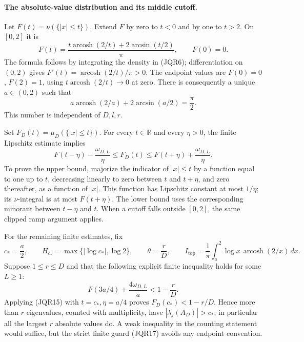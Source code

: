 \paragraph{The absolute-value distribution and its middle cutoff.}
Let \(F(t)=\nu(\{|x|\leq t\})\).  Extend \(F\) by zero to \(t<0\)
and by one to \(t>2\).  On \([0,2]\) it is
\[
 F(t)=\frac{t\operatorname{arcosh}(2/t)+2\arcsin(t/2)}{\pi},
 \qquad F(0)=0.
 \tag{JQR13}
\]
The formula follows by integrating the density in (JQR6);
differentiation on \((0,2)\) gives
\(F'(t)=\operatorname{arcosh}(2/t)/\pi>0\).
The endpoint values are \(F(0)=0\), \(F(2)=1\), using
\(t\operatorname{arcosh}(2/t)\to0\) at zero.
There is consequently a unique \(a\in(0,2)\) such that
\[
 a\operatorname{arcosh}(2/a)+2\arcsin(a/2)=\frac{\pi}{2}.
 \tag{JQR14}
\]
This number is independent of \(D,l,r\).

Set \(F_D(t)=\mu_D(\{|x|\leq t\})\).  For every \(t\in\mathbb R\)
and every \(\eta>0\), the finite Lipschitz estimate implies
\[
 F(t-\eta)-\frac{\omega_{D,L}}{\eta}
 \leq F_D(t)
 \leq F(t+\eta)+\frac{\omega_{D,L}}{\eta}.
 \tag{JQR15}
\]
To prove the upper bound, majorize the indicator of \(|x|\leq t\)
by a function equal to one up to \(t\), decreasing linearly to zero
between \(t\) and \(t+\eta\), and zero thereafter, as a function of
\(|x|\).  This function has Lipschitz constant at most \(1/\eta\);
its \(\nu\)-integral is at most \(F(t+\eta)\).  The lower bound uses
the corresponding minorant between \(t-\eta\) and \(t\).  When a
cutoff falls outside \([0,2]\), the same clipped ramp argument applies.

For the remaining finite estimates, fix
\[
 c_*=\frac a2,\qquad
 H_{c_*}=\max\{|\log c_*|,\log2\},\qquad
 \theta=\frac rD,\qquad
 I_{\mathrm{top}}=\frac1\pi
       \int_a^2\log x\,\operatorname{arcosh}(2/x)\,dx.
 \tag{JQR16}
\]
Suppose \(1\leq r\leq D\) and that the following explicit finite
inequality holds for some \(L\geq1\):
\[
 F(3a/4)+\frac{4\omega_{D,L}}a<1-\frac rD.
 \tag{JQR17}
\]
Applying (JQR15) with \(t=c_*,\eta=a/4\) proves
\(F_D(c_*)<1-r/D\).  Hence more than \(r\) eigenvalues, counted with
multiplicity, have \(|\lambda_j(A_D)|>c_*\); in particular all the
largest \(r\) absolute values do.  A weak inequality in the counting
statement would suffice, but the strict finite guard (JQR17)
avoids any endpoint convention.

